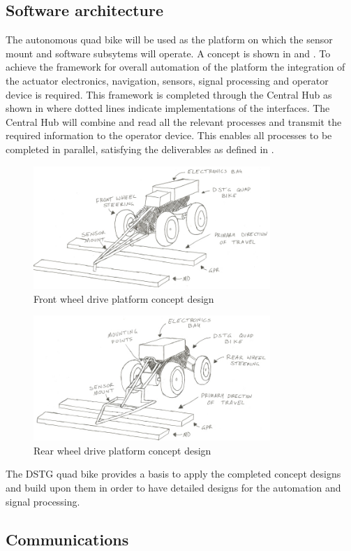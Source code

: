 \documentclass[main.tex]{subfiles}
\begin{document}
\subsection{Software architecture}
The autonomous quad bike will be used as the platform on which the sensor mount and software subsytems will operate. A concept is shown in  and . To achieve the framework for overall automation of the platform the integration of the actuator electronics, navigation, sensors, signal processing and operator device is required. This framework is completed through the Central Hub as shown in  where dotted lines indicate implementations of the interfaces. The Central Hub will combine and read all the relevant processes and transmit the required information to the operator device. This enables all processes to be completed in parallel, satisfying the deliverables as defined in .

\begin{figure}[ht]
\includegraphics[width = 0.8\textwidth]{3-ConceptDesign/ConceptFront.jpeg}
\centering
\caption{Front wheel drive platform concept design} 
\end{figure}
\begin{figure}[ht]
\includegraphics[width = 0.8\textwidth]{3-ConceptDesign/ConceptRear.jpeg}
\centering
\caption{Rear wheel drive platform concept design} 
\end{figure}

The DSTG quad bike provides a basis to apply the completed concept designs and build upon them in order to have detailed designs for the automation and signal processing. 

\subsection{Communications}
\end{document}
